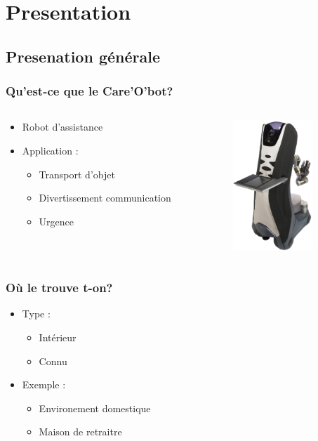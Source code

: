 \section{Presentation}
\subsection{Presenation générale}
\begin{frame}
	\frametitle{Qu'est-ce que le Care'O'bot?}
	\begin{columns}[T]
		\begin{column}{.5\textwidth}
			\begin{itemize}
			\item Robot d'assistance
			\item Application :
				\begin{itemize}
				\item Transport d'objet
				\item Divertissement communication
				\item Urgence
				\end{itemize}
			\end{itemize}
		\end{column}
   		\begin{column}{.5\textwidth}
			\includegraphics[width=3cm]{./image/Care_o_bot_3.jpg}
   		\end{column}
	\end{columns}
\end{frame}

\begin{frame}
	\frametitle{Où le trouve t-on?}
	\begin{itemize}
	\item Type :
		\begin{itemize}
		\item Intérieur
		\item Connu
		\end{itemize}
	\item Exemple :
		\begin{itemize}
		\item Environement domestique
		\item Maison de retraitre 
		\end{itemize}
	\end{itemize}
\end{frame}


